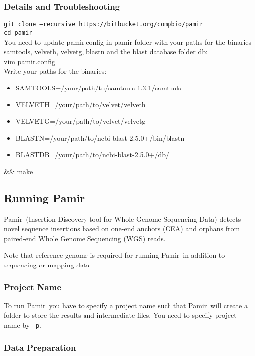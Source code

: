 \documentclass{article}
\newcommand{\toolName}{Pamir~}
\newcommand{\gitUrl}{https://bitbucket.org/compbio/pamir}
\begin{document}
\subsubsection{Details and Troubleshooting}
\begin{flushleft}
\texttt{git clone --recursive \gitUrl}\\
\texttt{cd pamir}\\

You need to update pamir.config in pamir folder with your paths for the binaries samtools, velveth, velvetg, blastn and the blast database folder db:\\
vim pamir.config\\
Write your paths for the binaries:
\begin{itemize}
\item SAMTOOLS=/your/path/to/samtools-1.3.1/samtools
\item VELVETH=/your/path/to/velvet/velveth
\item VELVETG=/your/path/to/velvet/velvetg
\item BLASTN=/your/path/to/ncbi-blast-2.5.0+/bin/blastn
\item BLASTDB=/your/path/to/ncbi-blast-2.5.0+/db/
\end{itemize}
\&\& make
\end{flushleft}

\subsection{Running \toolName}
\toolName (Insertion Discovery tool for Whole Genome Sequencing Data) 
detects novel sequence insertions based on one-end anchors (OEA) and orphans from paired-end Whole Genome Sequencing (WGS) reads.

Note that reference genome is required for running \toolName in addition to sequencing or mapping data.

\subsubsection{Project Name}
To run \toolName you have to specify a project name such that \toolName will create a folder to store the results and intermediate files. You need to specify project name by \texttt{-p}. 


\subsubsection{Data Preparation}
\end{document}
